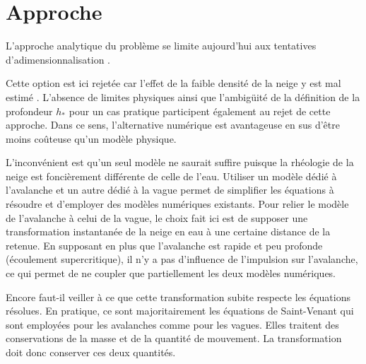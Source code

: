 \section{Approche}

L'approche analytique du problème se limite aujourd'hui aux tentatives d'adimensionnalisation \citep{heller}.

Cette option est ici rejetée car l'effet de la faible densité de la neige y est mal estimé \citep{zitti}. L'absence de limites physiques ainsi que l'ambigüité de la définition de la profondeur $h_\ast$ pour un cas pratique participent également au rejet de cette approche. Dans ce sens, l'alternative numérique est avantageuse en sus d'être moins coûteuse qu'un modèle physique.

L'inconvénient est qu'un seul modèle ne saurait suffire puisque la rhéologie de la neige est foncièrement différente de celle de l'eau. Utiliser un modèle dédié à l'avalanche et un autre dédié à la vague permet de simplifier les équations à résoudre et d'employer des modèles numériques existants. Pour relier le modèle de l'avalanche à celui de la vague, le choix fait ici est de supposer une transformation instantanée de la neige en eau à une certaine distance de la retenue. En supposant en plus que l'avalanche est rapide et peu profonde (écoulement supercritique), il n'y a pas d'influence de l'impulsion sur l'avalanche, ce qui permet de ne coupler que partiellement les deux modèles numériques.%

Encore faut-il veiller à ce que cette transformation subite respecte les équations résolues. En pratique, ce sont majoritairement les équations de Saint-Venant qui sont employées pour les avalanches comme pour les vagues. Elles traitent des conservations de la masse et de la quantité de mouvement. La transformation doit donc conserver ces deux quantités.